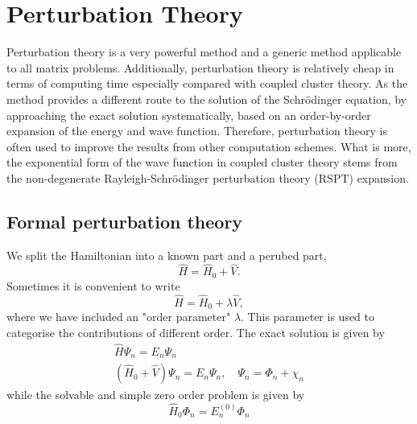 \chapter{Perturbation Theory}

Perturbation theory is a very powerful method and a generic method applicable to all 
matrix problems. Additionally, perturbation theory is relatively cheap in terms of computing
time especially compared with coupled cluster theory. As the method provides a different 
route to the solution of the Schrödinger equation, by approaching the exact solution 
systematically, based on an order-by-order expansion of the energy and wave function. 
Therefore, perturbation theory is often used to improve the results from other computation 
schemes. What is more, the exponential form of the wave function in coupled cluster theory 
stems from the non-degenerate Rayleigh-Schrödinger perturbation theory (RSPT) expansion.

\section{Formal perturbation theory}

We split the Hamiltonian into a known part and a perubed part,
\begin{equation}
    \hat{H} = \hat{H}_0 + \hat{V}.
\end{equation}
Sometimes it is convenient to write
\begin{equation}
    \label{eq:schrodinger_w_order_param}
    \hat{H} = \hat{H}_0 + \lambda\hat{V},
\end{equation}
where we have included an "order parameter" $\lambda$. This parameter is used to categorise
the contributions of different order. 
The exact solution is given by
\begin{equation}
    \label{eq:perturbation_schrodinger}
    \begin{gathered}
        \hat{H} \Psi_n = E_n \Psi_n \\
        (\hat{H}_0 + \hat{V}) \Psi_n = E_n \Psi_n, \quad \Psi_n = \Phi_n + \chi_n
    \end{gathered}
\end{equation}
while the solvable and simple zero order problem is given by
\begin{equation}
    \label{eq:zero_order_perturbed_schrodinger}
    \hat{H}_0 \Phi_n = E_n^{(0)} \Phi_n
\end{equation}

